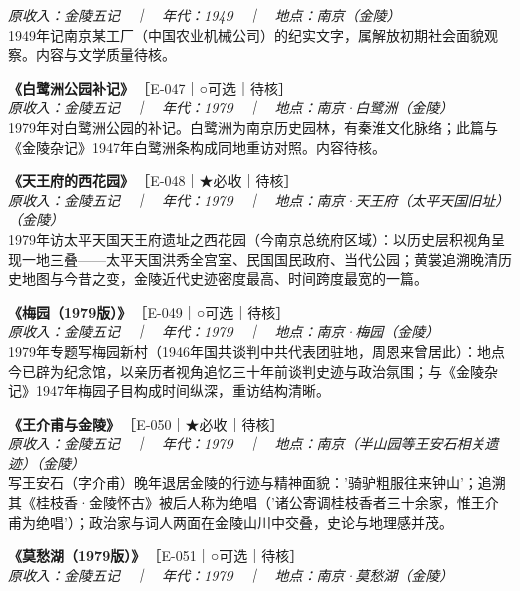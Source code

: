 \documentclass[UTF8,fontset=none,zihao=-4,a4paper]{ctexart}
\begin{document}
{\small\itshape 原收入：金陵五记　｜　年代：1949　｜　地点：南京（金陵）}\\
1949年记南京某工厂（中国农业机械公司）的纪实文字，属解放初期社会面貌观察。内容与文学质量待核。
\par\vspace{5pt}
\noindent\textbf{《白鹭洲公园补记》}\,{\small ［E-047｜○可选｜待核］}\\
{\small\itshape 原收入：金陵五记　｜　年代：1979　｜　地点：南京·白鹭洲（金陵）}\\
1979年对白鹭洲公园的补记。白鹭洲为南京历史园林，有秦淮文化脉络；此篇与《金陵杂记》1947年白鹭洲条构成同地重访对照。内容待核。
\par\vspace{5pt}
\noindent\textbf{《天王府的西花园》}\,{\small ［E-048｜★必收｜待核］}\\
{\small\itshape 原收入：金陵五记　｜　年代：1979　｜　地点：南京·天王府（太平天国旧址）（金陵）}\\
1979年访太平天国天王府遗址之西花园（今南京总统府区域）：以历史层积视角呈现一地三叠——太平天国洪秀全宫室、民国国民政府、当代公园；黄裳追溯晚清历史地图与今昔之变，金陵近代史迹密度最高、时间跨度最宽的一篇。
\par\vspace{5pt}
\noindent\textbf{《梅园（1979版）》}\,{\small ［E-049｜○可选｜待核］}\\
{\small\itshape 原收入：金陵五记　｜　年代：1979　｜　地点：南京·梅园（金陵）}\\
1979年专题写梅园新村（1946年国共谈判中共代表团驻地，周恩来曾居此）：地点今已辟为纪念馆，以亲历者视角追忆三十年前谈判史迹与政治氛围；与《金陵杂记》1947年梅园子目构成时间纵深，重访结构清晰。
\par\vspace{5pt}
\noindent\textbf{《王介甫与金陵》}\,{\small ［E-050｜★必收｜待核］}\\
{\small\itshape 原收入：金陵五记　｜　年代：1979　｜　地点：南京（半山园等王安石相关遗迹）（金陵）}\\
写王安石（字介甫）晚年退居金陵的行迹与精神面貌：'骑驴粗服往来钟山'；追溯其《桂枝香·金陵怀古》被后人称为绝唱（'诸公寄调桂枝香者三十余家，惟王介甫为绝唱'）；政治家与词人两面在金陵山川中交叠，史论与地理感并茂。
\par\vspace{5pt}
\noindent\textbf{《莫愁湖（1979版）》}\,{\small ［E-051｜○可选｜待核］}\\
{\small\itshape 原收入：金陵五记　｜　年代：1979　｜　地点：南京·莫愁湖（金陵）}\\
\end{document}
